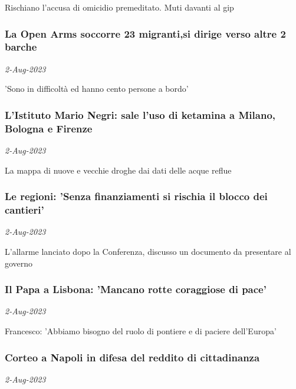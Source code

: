 Rischiano l'accusa di omicidio premeditato. Muti davanti al gip
\subsubsection{La Open Arms soccorre 23 migranti,si dirige verso altre 2 barche \href{https://www.ansa.it/sito/notizie/cronaca/2023/08/02/la-open-arms-soccorre-23-migrantisi-dirige-verso-altre-2-barche_ec189b5d-ec66-45fb-8add-996575fbd8e2.html}{}}
\textit{2-Aug-2023}

'Sono in difficolt\`{a} ed hanno cento persone a bordo'
\subsubsection{L'Istituto Mario Negri: sale l'uso di ketamina a Milano, Bologna e Firenze \href{https://www.ansa.it/sito/notizie/cronaca/2023/08/02/listituto-mario-negri-sale-luso-di-ketamina-a-milano-bologna-e-firenze_82963a44-7282-4bed-8d0e-cade5fe8d526.html}{}}
\textit{2-Aug-2023}

La mappa di nuove e vecchie droghe dai dati delle acque reflue
\subsubsection{Le regioni: 'Senza finanziamenti si rischia il blocco dei cantieri' \href{https://www.ansa.it/sito/notizie/cronaca/2023/08/02/le-regioni-senza-finanziamenti-si-rischia-il-blocco-cantieri_dc421802-f461-42b9-9bdf-d75546b4bef5.html}{}}
\textit{2-Aug-2023}

L'allarme lanciato dopo la Conferenza, discusso un documento da presentare al governo
\subsubsection{Il Papa a Lisbona: 'Mancano rotte coraggiose di pace' \href{https://www.ansa.it/sito/notizie/cronaca/2023/08/02/il-papa-a-lisbona-mancano-rotte-coraggiose-di-pace_fea603de-24f2-4030-907c-64e01cb47d10.html}{}}
\textit{2-Aug-2023}

Francesco: 'Abbiamo bisogno del ruolo di pontiere e di paciere dell'Europa'
\subsubsection{Corteo a Napoli in difesa del reddito di cittadinanza \href{https://www.ansa.it/sito/notizie/cronaca/2023/08/02/corteo-a-napoli-in-difesa-del-reddito-di-cittadinanza_f06d91de-430e-4fad-9545-70ef49ffce95.html}{}}
\textit{2-Aug-2023}

